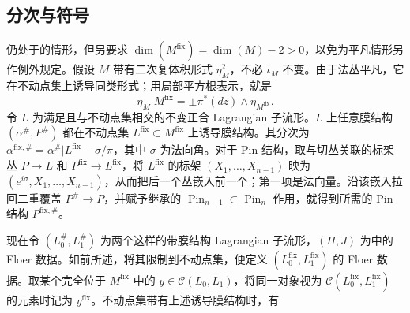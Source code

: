 \subsection{分次与符号}\label{sec:14d}
仍处于的情形，但另要求 $\dim(M^{\mathrm{fix}})=\dim(M)-2>0$，以免为平凡情形另作例外规定。假设 $M$ 带有二次复体积形式 $\eta_M^2$，不必 $\iota_M$ 不变。由于法丛平凡，它在不动点集上诱导同类形式；用局部平方根表示，就是
\[
\eta_M|M^{\mathrm{fix}}=\pm\pi^*(dz)\wedge\eta_{M^{\mathrm{fix}}}.
\]
令 $L$ 为满足且与不动点集相交的不变正合 Lagrangian 子流形。$L$ 上任意膜结构 $(\alpha^\#,P^\#)$ 都在不动点集
$L^{\mathrm{fix}}\subset M^{\mathrm{fix}}$ 上诱导膜结构。其分次为 $\alpha^{\mathrm{fix},\#}=\alpha^\#|L^{\mathrm{fix}}-\sigma/\pi$，其中 $\sigma$ 为法向角。对于 Pin 结构，取与切丛关联的标架丛 $P\to L$ 和 $P^{\mathrm{fix}}\to L^{\mathrm{fix}}$，将 $L^{\mathrm{fix}}$ 的标架 $(X_1,\ldots,X_{n-1})$ 映为 $(e^{i\sigma},X_1,\ldots,X_{n-1})$，从而把后一个丛嵌入前一个；第一项是法向量。沿该嵌入拉回二重覆盖 $P^\#\to P$，并赋予继承的 $\operatorname{Pin}_{n-1}\subset\operatorname{Pin}_n$ 作用，就得到所需的 Pin 结构 $P^{\mathrm{fix},\#}$。

现在令 $(L_0^\#,L_1^\#)$ 为两个这样的带膜结构 Lagrangian 子流形，$(H,J)$ 为中的 Floer 数据。如前所述，将其限制到不动点集，便定义 $(L_0^{\mathrm{fix}},L_1^{\mathrm{fix}})$ 的 Floer 数据。取某个完全位于 $M^{\mathrm{fix}}$ 中的 $y\in\mathcal C(L_0,L_1)$，将同一对象视为 $\mathcal C(L_0^{\mathrm{fix}},L_1^{\mathrm{fix}})$ 的元素时记为 $y^{\mathrm{fix}}$。不动点集带有上述诱导膜结构时，有

